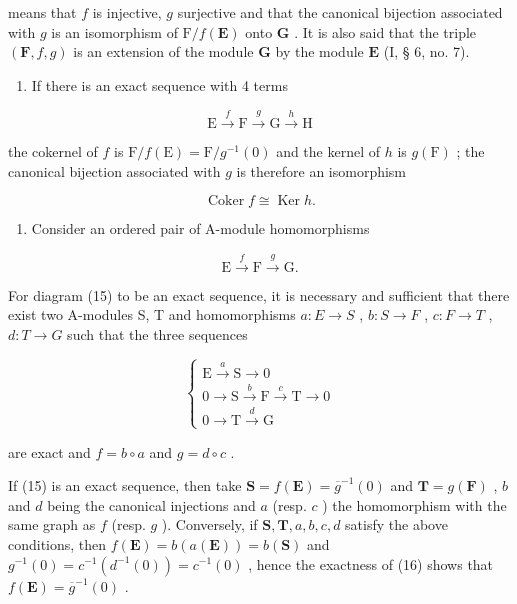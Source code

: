 means that \(f\) is injective, \(g\) surjective and that the canonical bijection associated with \(g\) is an isomorphism of \(\mathrm{F} / f(\mathbf{E})\) onto \(\mathbf{G}\) . It is also said that the triple \((\mathbf{F}, f, g)\) is an extension of the module \(\mathbf{G}\) by the module \(\mathbf{E}\) (I, § 6, no. 7).

\begin{enumerate}
\def\labelenumi{(\arabic{enumi})}
\setcounter{enumi}{2}
\tightlist
\item
  If there is an exact sequence with 4 terms
\end{enumerate}

\[
\mathrm{E} \xrightarrow {f} \mathrm{F} \xrightarrow {g} \mathrm{G} \xrightarrow {h} \mathrm{H}
\]

the cokernel of \(f\) is \(\mathrm{F} / f(\mathrm{E}) = \mathrm{F} / g^{-1}(0)\) and the kernel of \(h\) is \(g(\mathrm{F})\) ; the canonical bijection associated with \(g\) is therefore an isomorphism

\[
\operatorname{Coker} f \cong \operatorname{Ker} h.
\]

\begin{enumerate}
\def\labelenumi{(\arabic{enumi})}
\setcounter{enumi}{3}
\tightlist
\item
  Consider an ordered pair of A-module homomorphisms
\end{enumerate}

\[
\mathrm{E} \xrightarrow {f} \mathrm{F} \xrightarrow {g} \mathrm{G}.\tag{15}
\]

For diagram (15) to be an exact sequence, it is necessary and sufficient that there exist two A-modules S, T and homomorphisms \(a:E\to S\) , \(b:S\to F\) , \(c:F\to T\) , \(d:T\to G\) such that the three sequences

\[
\left\{ \begin{array}{c} \mathrm{E} \xrightarrow {a} \mathrm{S} \longrightarrow 0 \\ 0 \longrightarrow \mathrm{S} \xrightarrow {b} \mathrm{F} \xrightarrow {c} \mathrm{T} \longrightarrow 0 \\ 0 \longrightarrow \mathrm{T} \xrightarrow {d} \mathrm{G} \end{array} \right.\tag{16}
\]

are exact and \(f = b \circ a\) and \(g = d \circ c\) .

If (15) is an exact sequence, then take \(\mathbf{S} = f(\mathbf{E}) = \overline{g}^{-1}(0)\) and \(\mathbf{T} = g(\mathbf{F})\) , \(b\) and \(d\) being the canonical injections and \(a\) (resp. \(c\) ) the homomorphism with the same graph as \(f\) (resp. \(g\) ). Conversely, if \(\mathbf{S}, \mathbf{T}, a, b, c, d\) satisfy the above conditions, then \(f(\mathbf{E}) = b(a(\mathbf{E})) = b(\mathbf{S})\) and \(g^{-1}(0) = c^{-1}(d^{-1}(0)) = c^{-1}(0)\) , hence the exactness of (16) shows that \(f(\mathbf{E}) = \overline{g}^{-1}(0)\) .


